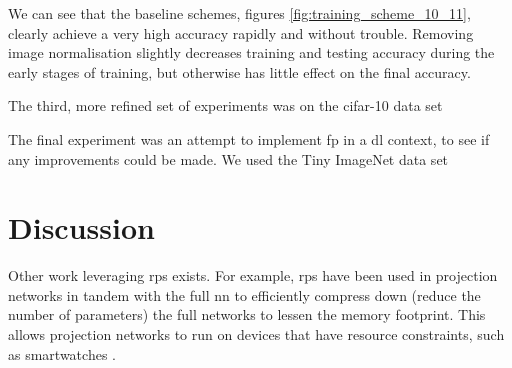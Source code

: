 We can see that the baseline schemes, figures \ref{fig:training_scheme_10_11}, clearly achieve a very high accuracy rapidly and without trouble. Removing image normalisation slightly decreases training and testing accuracy during the early stages of training, but otherwise has little effect on the final accuracy.

The third, more refined set of experiments was on the \gls{cifar}-10 data set

The final experiment was an attempt to implement \gls{fp} in a \gls{dl} context, to see if any improvements could be made. We used the Tiny ImageNet data set

\section{Discussion}

Other work leveraging \gls{rp}s exists. For example, \gls{rp}s have been used in projection networks in tandem with the full \gls{nn} to efficiently compress down (reduce the number of parameters) the full networks to lessen the memory footprint. This allows projection networks to run on devices that have resource constraints, such as smartwatches \cite{projection_net}. 


